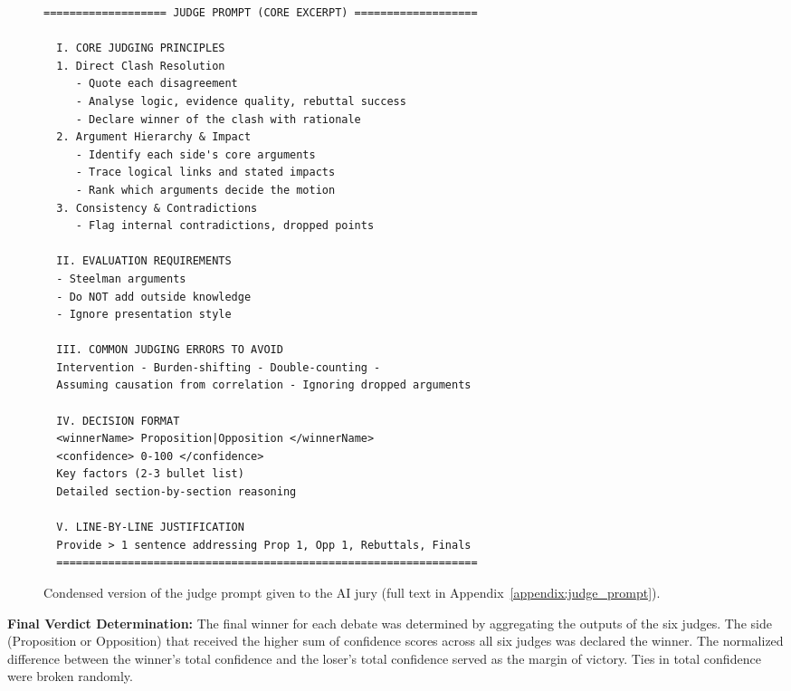 \documentclass{article}
\begin{document}
\begin{figure}[htbp]           %
    \centering
    \lstset{style=promptstyle}
    \begin{adjustbox}{max height=0.45\textheight}
    \begin{lstlisting}[language={}]
  =================== JUDGE PROMPT (CORE EXCERPT) ===================

  I. CORE JUDGING PRINCIPLES
  1. Direct Clash Resolution
     - Quote each disagreement
     - Analyse logic, evidence quality, rebuttal success
     - Declare winner of the clash with rationale
  2. Argument Hierarchy & Impact
     - Identify each side's core arguments
     - Trace logical links and stated impacts
     - Rank which arguments decide the motion
  3. Consistency & Contradictions
     - Flag internal contradictions, dropped points

  II. EVALUATION REQUIREMENTS
  - Steelman arguments
  - Do NOT add outside knowledge
  - Ignore presentation style

  III. COMMON JUDGING ERRORS TO AVOID
  Intervention - Burden-shifting - Double-counting -
  Assuming causation from correlation - Ignoring dropped arguments

  IV. DECISION FORMAT
  <winnerName> Proposition|Opposition </winnerName>
  <confidence> 0-100 </confidence>
  Key factors (2-3 bullet list)
  Detailed section-by-section reasoning

  V. LINE-BY-LINE JUSTIFICATION
  Provide > 1 sentence addressing Prop 1, Opp 1, Rebuttals, Finals
  =================================================================
    \end{lstlisting}
    \end{adjustbox}

    \caption{Condensed version of the judge prompt given to the AI jury
    (full text in Appendix~\ref{appendix:judge_prompt}).}
    \label{fig:judge-prompt}
  \end{figure}


\textbf{Final Verdict Determination:} The final winner for each debate was determined by aggregating the outputs of the six judges. The side (Proposition or Opposition) that received the higher sum of confidence scores across all six judges was declared the winner. The normalized difference between the winner's total confidence and the loser's total confidence served as the margin of victory. Ties in total confidence were broken randomly.
\end{document}

